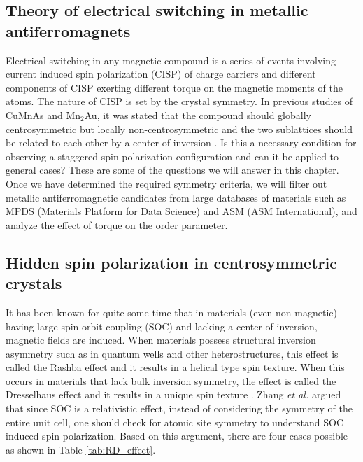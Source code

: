 \documentclass[11pt,edeposit,draftthesis]{uiucthesis2020}
\begin{document}
\begin{mainmatter}
\chapter{Theory of electrical switching in metallic antiferromagnets}

Electrical switching in any magnetic compound is a series of events involving current induced spin polarization (CISP) of charge carriers and different components of CISP exerting different torque on the magnetic moments of the atoms. The nature of CISP is set by the crystal symmetry. In previous studies of CuMnAs and Mn$_2$Au, it was stated that the compound should globally centrosymmetric but locally non-centrosymmetric and the two sublattices should be related to each other by a center of inversion \cite{Zelezny2014,Zelezny2017,Wadley2016}. Is this a necessary condition for observing a staggered spin polarization configuration and can it be applied to general cases? These are some of the questions we will answer in this chapter. Once we have determined the required symmetry criteria, we will filter out metallic antiferromagnetic candidates from large databases of materials such as MPDS (Materials Platform for Data Science) and ASM (ASM International), and analyze the effect of torque on the order parameter.

\section{Hidden spin polarization in centrosymmetric crystals}

It has been known for quite some time that in materials (even non-magnetic) having large spin orbit coupling (SOC) and lacking a center of inversion, magnetic fields are induced. When materials possess structural inversion asymmetry such as in quantum wells and other heterostructures, this effect is called the Rashba effect and it results in a helical type spin texture. When this occurs in materials that lack bulk inversion symmetry, the effect is called the Dresselhaus effect and it results in a unique spin texture \cite{Zhang2014}. Zhang \emph{et al.} \cite{Zhang2014} argued that since SOC is a relativistic effect, instead of considering the symmetry of the entire unit cell, one should check for atomic site symmetry to understand SOC induced spin polarization. Based on this argument, there are four cases possible as shown in Table \ref{tab:RD_effect}.


\end{mainmatter}
\end{document}
